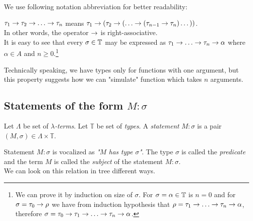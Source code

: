 \documentclass[12pt,a4paper]{report}
\newcommand{\lterms}{$\lambda$-terms\xspace}
\begin{document}
We use following notation
abbreviation for better readability:

$\tau_1 \ar \tau_2 \ar \dots \ar \tau_n$ means 
$\tau_1 \ar (\tau_2 \ar (\dots \ar (\tau_{n-1} \ar \tau_n)\dots))$.\\

In other words, the operator $\rightarrow$ is right-associative.\\

It is easy to see that every $\sigma \in \mathbb{T}$ may be expressed as 
$\tau_1 \ar \dots \ar \tau_n \ar \alpha$ 
where $\alpha \in A$ and $n \geq 0$.\footnote{ 
We can prove it by induction on size of $\sigma$. 
For $\sigma = \alpha \in \mathbb{T}$ is $n = 0$ and for $\sigma = \tau_0 \rightarrow \rho$
we have from induction hypothesis that $\rho = \tau_1 \ar \dots \ar \tau_n \ar \alpha$,
therefore
$\sigma = \tau_0 \ar \tau_1 \ar \dots \ar \tau_n \ar \alpha$.}

Technically speaking, we have types only for functions with one argument, but
this property suggests how we can "simulate" function which takes $n$ arguments.
  

	
\subsection{Statements of the form $M : \sigma$}

\begin{definition}
	Let $\Lambda$ be set of {\it \lterms}. 
	Let $\mathbb{T}$ be set of {\it types}.       
	A {\it statement} $M : \sigma$ is a pair 
	$(M,\sigma) \in \Lambda \times \mathbb{T}$.
	\\ 
\end{definition}
	
Statement $M : \sigma$ is vocalized as {\it "$M$ has type $\sigma$"}.
The type $\sigma$ is called the {\it predicate} and 
the term $M$ is called the {\it subject} of the statement $M : \sigma$. \\

We can look on this relation in tree different ways.
\end{document}
